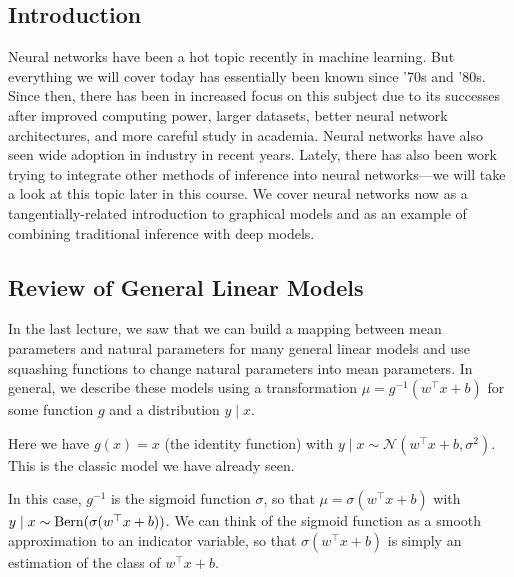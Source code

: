 \documentclass{article}
\begin{document}

\subsection{Introduction}

Neural networks have been a hot topic recently in machine learning. But everything we will cover today has essentially been known since '70s and '80s. Since then, there has been in increased focus on this subject due to its successes after improved computing power, larger datasets, better neural network architectures, and more careful study in academia. Neural networks have also seen wide adoption in industry in recent years. Lately, there has also been work trying to integrate other methods of inference into neural networks---we will take a look at this topic later in this course.  We cover neural networks now as a tangentially-related introduction to graphical models and as an example of combining traditional inference with deep models.

\subsection{Review of General Linear Models}

In the last lecture, we saw that we can build a mapping between mean parameters and natural parameters for many general linear models and use squashing functions to change natural parameters into mean parameters.  In general, we describe these models using a transformation $\mu = g^{-1}(w^\top x+b)$ for some function $g$ and a distribution $y \mid x$.

\begin{example}
    Here we have $g(x) = x$ (the identity function) with $y \mid x \sim \mathcal{N}(w^\top x+b, \sigma^2)$.  This is the classic model we have already seen.
\end{example}

\begin{example}
    In this case, $g^{-1}$ is the sigmoid function $\sigma$, so that $\mu = \sigma(w^\top x+b)$ with $y \mid x \sim\operatorname{Bern}(\sigma(w^\top x+b))$.  We can think of the sigmoid function as a smooth approximation to an indicator variable, so that $\sigma(w^\top x+b)$ is simply an estimation of the class of $w^\top x+b$.
\end{example}
\end{document}
